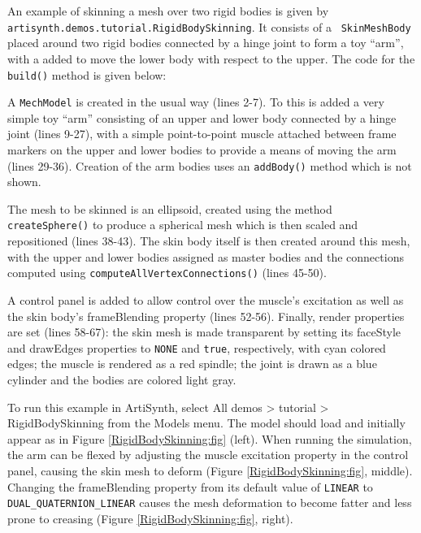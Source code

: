 An example of skinning a mesh over two rigid bodies is given by {\tt
artisynth.demos.tutorial.RigidBodySkinning}.  It consists of a {\tt
SkinMeshBody} placed around two rigid bodies connected by a hinge
joint to form a toy ``arm'', with a
 added to move the lower
body with respect to the upper.  
The code for the {\tt build()} method is given below:
\lstset{numbers=left}
\iflatexml
  
\else
  
\fi
\lstset{numbers=none}

A {\tt MechModel} is created in the usual way (lines 2-7).  To this is
added a very simple toy ``arm'' consisting of an upper and lower body
connected by a hinge joint (lines 9-27), with a simple
point-to-point muscle attached between frame markers on the upper and
lower bodies to provide a means of moving the arm (lines 29-36).
Creation of the arm bodies uses an {\tt addBody()} method which is not
shown.

The mesh to be skinned is an ellipsoid, created using the
 method {\tt createSphere()}
to produce a spherical mesh which is then scaled and repositioned
(lines 38-43). The skin body itself is then created around this mesh,
with the upper and lower bodies assigned as master bodies and the
connections computed using {\tt computeAllVertexConnections()} (lines
45-50).

A control panel is added to allow control over the muscle's {\sf
excitation} as well as the skin body's {\sf frameBlending} property
(lines 52-56). Finally, render properties are set (lines 58-67): the
skin mesh is made transparent by setting its {\sf faceStyle} and
{\sf drawEdges} properties to {\tt NONE} and {\tt true}, respectively,
with cyan colored edges; the muscle is rendered as a red spindle; the
joint is drawn as a blue cylinder and the bodies are colored light
gray.

To run this example in ArtiSynth, select {\sf All demos > tutorial >
RigidBodySkinning} from the {\sf Models} menu. The model should load
and initially appear as in Figure \ref{RigidBodySkinning:fig}
(left). When running the simulation, the arm can be flexed by
adjusting the muscle {\sf excitation} property in the control panel,
causing the skin mesh to deform (Figure
\ref{RigidBodySkinning:fig}, middle). Changing the
{\sf frameBlending} property from its default value of {\tt LINEAR} to
{\tt DUAL\_QUATERNION\_LINEAR} causes the mesh deformation to become
fatter and less prone to creasing (Figure
\ref{RigidBodySkinning:fig}, right).


